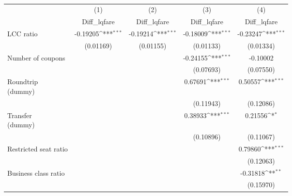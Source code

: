 \begin{table}[htbp]\centering
\def\sym#1{\ifmmode^{#1}\else\(^{#1}\)\fi}
\caption{ \label{asvxfd}}
\begin{tabular}{l*{4}{c}}
\toprule
                    &\multicolumn{1}{c}{(1)}&\multicolumn{1}{c}{(2)}&\multicolumn{1}{c}{(3)}&\multicolumn{1}{c}{(4)}\\
                    &\multicolumn{1}{c}{Diff\_lqfare}&\multicolumn{1}{c}{Diff\_lqfare}&\multicolumn{1}{c}{Diff\_lqfare}&\multicolumn{1}{c}{Diff\_lqfare}\\
\midrule
LCC ratio           &    -0.19205\sym{***}&    -0.19214\sym{***}&    -0.18009\sym{***}&    -0.23247\sym{***}\\
                    &   (0.01169)         &   (0.01155)         &   (0.01133)         &   (0.01334)         \\
\addlinespace
Number of coupons   &                     &                     &    -0.24155\sym{***}&    -0.10002         \\
                    &                     &                     &   (0.07693)         &   (0.07550)         \\
\addlinespace
\Centerstack{Roundtrip \\ (dummy)}&                     &                     &     0.67691\sym{***}&     0.50557\sym{***}\\
                    &                     &                     &   (0.11943)         &   (0.12086)         \\
\addlinespace
\Centerstack{Transfer \\ (dummy)}&                     &                     &     0.38933\sym{***}&     0.21556\sym{*}  \\
                    &                     &                     &   (0.10896)         &   (0.11067)         \\
\addlinespace
Restricted seat ratio&                     &                     &                     &     0.79860\sym{***}\\
                    &                     &                     &                     &   (0.12063)         \\
\addlinespace
Business class ratio&                     &                     &                     &    -0.31818\sym{**} \\
                    &                     &                     &                     &   (0.15970)         \\

\end{tabular}
\end{table}
